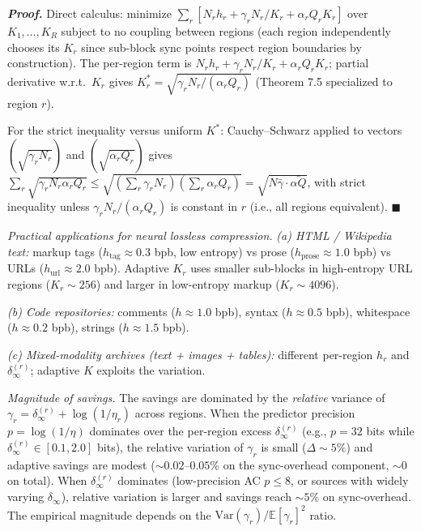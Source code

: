 \documentclass[
]{article}
\begin{document}
\emph{\textbf{Proof.}} Direct calculus: minimize
$\sum_r [N_r h_r + \gamma_r N_r / K_r + \alpha_r Q_r K_r]$ over
$K_1, \ldots, K_R$ subject to no coupling between regions (each region
independently chooses its $K_r$ since sub-block sync points respect
region boundaries by construction). The per-region term is
$N_r h_r + \gamma_r N_r/K_r + \alpha_r Q_r K_r$; partial derivative
w.r.t.\ $K_r$ gives $K_r^* = \sqrt{\gamma_r N_r / (\alpha_r Q_r)}$
(Theorem 7.5 specialized to region $r$).

For the strict inequality versus uniform $K^*$: Cauchy--Schwarz applied
to vectors $(\sqrt{\gamma_r N_r})$ and $(\sqrt{\alpha_r Q_r})$ gives
$\sum_r \sqrt{\gamma_r N_r \alpha_r Q_r} \leq \sqrt{(\sum_r \gamma_r N_r)
(\sum_r \alpha_r Q_r)} = \sqrt{N \bar{\gamma} \cdot \bar{\alpha Q}}$,
with strict inequality unless $\gamma_r N_r / (\alpha_r Q_r)$ is
constant in $r$ (i.e., all regions equivalent).
\hfill$\blacksquare$

\emph{Practical applications for neural lossless compression.}
\emph{(a) HTML / Wikipedia text: } markup tags ($h_{\text{tag}} \approx
0.3$ bpb, low entropy) vs prose ($h_{\text{prose}} \approx 1.0$ bpb)
vs URLs ($h_{\text{url}} \approx 2.0$ bpb). Adaptive $K_r$ uses smaller
sub-blocks in high-entropy URL regions ($K_r \sim 256$) and larger in
low-entropy markup ($K_r \sim 4096$).

\emph{(b) Code repositories: } comments ($h \approx 1.0$ bpb), syntax
($h \approx 0.5$ bpb), whitespace ($h \approx 0.2$ bpb), strings
($h \approx 1.5$ bpb).

\emph{(c) Mixed-modality archives (text + images + tables):} different
per-region $h_r$ and $\delta_\infty^{(r)}$; adaptive $K$ exploits the
variation.

\emph{Magnitude of savings.} The savings are dominated by the
\emph{relative} variance of $\gamma_r = \delta_\infty^{(r)} +
\log(1/\eta_r)$ across regions. When the predictor precision $p =
\log(1/\eta)$ dominates over the per-region excess
$\delta_\infty^{(r)}$ (e.g., $p = 32$ bits while
$\delta_\infty^{(r)} \in [0.1, 2.0]$ bits), the relative variation of
$\gamma_r$ is small ($\Delta \sim 5\%$) and adaptive savings are
modest ($\sim 0.02$--$0.05\%$ on the sync-overhead component, $\sim 0$
on total). When $\delta_\infty^{(r)}$ dominates (low-precision AC
$p \leq 8$, or sources with widely varying $\delta_\infty$),
relative variation is larger and savings reach $\sim 5\%$ on
sync-overhead. The empirical magnitude depends on the
$\mathrm{Var}(\gamma_r) / \mathbb{E}[\gamma_r]^2$ ratio.
\end{document}
